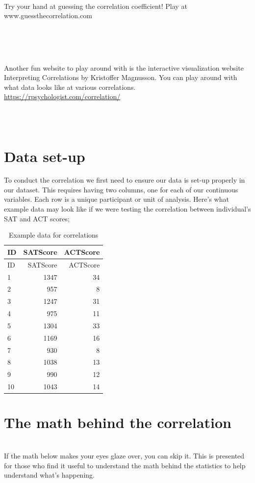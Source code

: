 \documentclass[
]{book}
\newenvironment{info}
    {
    \hline\\
    }
    { 
    \\\\\hline
    }
\newenvironment{try}
    {
    \hline\\
    }
    { 
    \\\\\hline
    }
\begin{document}
\begin{try}
Try your hand at guessing the correlation coefficient! Play at
www.guessthecorrelation.com
\end{try}

\begin{try}
Another fun website to play around with is the interactive visualization
website Interpreting Correlations by Kristoffer Magnusson. You can play
around with what data looks like at various correlations.
\url{https://rpsychologist.com/correlation/}
\end{try}

\hypertarget{data-set-up-7}{%
\section{Data set-up}\label{data-set-up-7}}

To conduct the correlation we first need to ensure our data is set-up properly in our dataset. This requires having two columns, one for each of our continuous variables. Each row is a unique participant or unit of analysis. Here's what example data may look like if we were testing the correlation between individual's SAT and ACT scores;

\begin{longtable}[]{@{}lrr@{}}
\caption{Example data for correlations}\tabularnewline
\toprule
ID & SATScore & ACTScore\tabularnewline
\midrule
\endfirsthead
\toprule
ID & SATScore & ACTScore\tabularnewline
\midrule
\endhead
1 & 1347 & 34\tabularnewline
2 & 957 & 8\tabularnewline
3 & 1247 & 31\tabularnewline
4 & 975 & 11\tabularnewline
5 & 1304 & 33\tabularnewline
6 & 1169 & 16\tabularnewline
7 & 930 & 8\tabularnewline
8 & 1038 & 13\tabularnewline
9 & 990 & 12\tabularnewline
10 & 1043 & 14\tabularnewline
\bottomrule
\end{longtable}

\hypertarget{the-math-behind-the-correlation}{%
\section{The math behind the correlation}\label{the-math-behind-the-correlation}}

\begin{info}
If the math below makes your eyes glaze over, you can skip it. This is
presented for those who find it useful to understand the math behind the
statistics to help understand what's happening.
\end{info}
\end{document}
